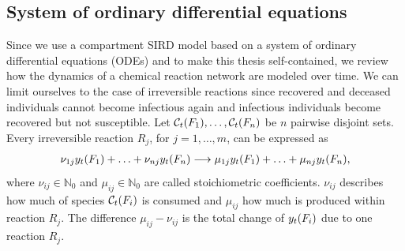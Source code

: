 \subsection{System of ordinary differential equations}
Since we use a compartment SIRD model based on a system of ordinary differential equations (ODEs) and to make this thesis self-contained, we review how the dynamics of a chemical reaction network are modeled over time. We can limit ourselves to the case of irreversible reactions since recovered and deceased individuals cannot become infectious again and infectious individuals become recovered but not susceptible. Let $\mathcal{C}_t(F_1), \dots, \mathcal{C}_t(F_n)$ be $n$ pairwise disjoint sets. Every irreversible reaction $R_j$, for $j = 1, \dots, m$, can be expressed as
\begin{align}
\nu_{1j} y_t(F_1) + \hdots + \nu_{nj} y_t(F_n) \longrightarrow \mu_{1j} y_t(F_1) + \hdots + \mu_{nj} y_t(F_n),
\end{align}
where $\nu_{ij} \in \mathbb{N}_0$ and $\mu_{ij} \in \mathbb{N}_0$ are called stoichiometric coefficients. $\nu_{ij}$ describes how much of species $\mathcal{C}_t(F_i)$ is consumed and $\mu_{ij}$ how much is produced within reaction $R_j$. The difference $\mu_{ij} - \nu_{ij}$ is the total change of $y_t(F_i)$ due to one reaction $R_j$. 

